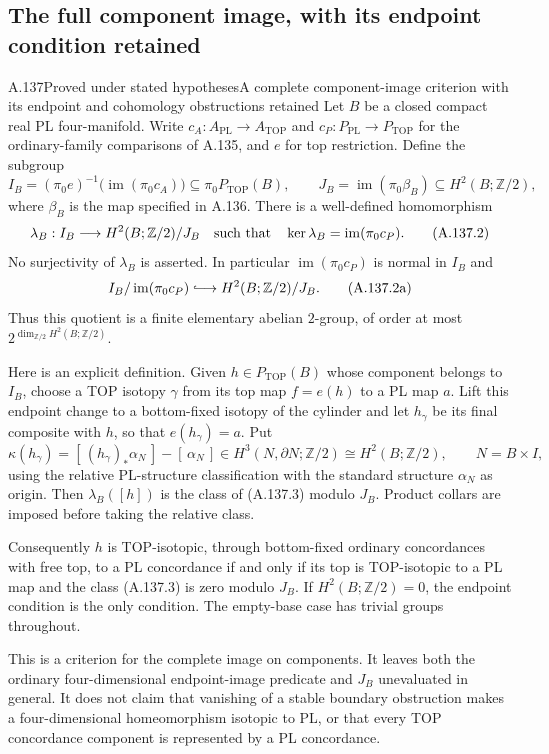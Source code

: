 \subsection{The full component image, with its endpoint condition retained}

\begin{saresult}{A.137}{Proved under stated hypotheses}{A complete component-image criterion with its endpoint and cohomology obstructions retained}
Let $B$ be a closed compact real PL four-manifold. Write
$c_A:A_{\mathrm{PL}}\to A_{\mathrm{TOP}}$ and
$c_P:P_{\mathrm{PL}}\to P_{\mathrm{TOP}}$ for the ordinary-family
comparisons of A.135, and $e$ for top restriction. Define the subgroup
\[
 I_B=(\pi_0e)^{-1}
       \bigl(\operatorname{im}(\pi_0c_A)\bigr)
       \subseteq\pi_0P_{\mathrm{TOP}}(B),
 \qquad
 J_B=\operatorname{im}(\pi_0\beta_B)
       \subseteq H^2(B;\mathbb Z/2),                    \tag{A.137.1}
\]
where $\beta_B$ is the map specified in A.136. There is a
well-defined homomorphism
\[
 \lambda_B:I_B\longrightarrow H^2(B;\mathbb Z/2)/J_B
 \quad\hbox{such that}\quad
 \ker\lambda_B=\operatorname{im}(\pi_0c_P).             \tag{A.137.2}
\]
No surjectivity of $\lambda_B$ is asserted.
In particular $\operatorname{im}(\pi_0c_P)$ is normal in $I_B$ and
\[
 I_B/\operatorname{im}(\pi_0c_P)
     \lhook\joinrel\longrightarrow H^2(B;\mathbb Z/2)/J_B.
                                                               \tag{A.137.2a}
\]
Thus this quotient is a finite elementary abelian $2$-group, of
order at most $2^{\dim_{\mathbb Z/2}H^2(B;\mathbb Z/2)}$.

Here is an explicit definition. Given $h\in P_{\mathrm{TOP}}(B)$
whose component belongs to $I_B$, choose a TOP isotopy $\gamma$
from its top map $f=e(h)$ to a PL map $a$. Lift this endpoint change
to a bottom-fixed isotopy of the cylinder and let $h_\gamma$ be its
final composite with $h$, so that $e(h_\gamma)=a$. Put
\[
 \kappa(h_\gamma)
   =[\,(h_\gamma)_*\alpha_N\,]-[\,\alpha_N\,]
   \in H^3(N,\partial N;\mathbb Z/2)
   \cong H^2(B;\mathbb Z/2),\qquad N=B\times I,         \tag{A.137.3}
\]
using the relative PL-structure classification with the standard
structure $\alpha_N$ as origin. Then
$\lambda_B([h])$ is the class of (A.137.3) modulo $J_B$.
Product collars are imposed before taking the relative class.

Consequently $h$ is TOP-isotopic, through bottom-fixed ordinary
concordances with free top, to a PL concordance if and only if its top
is TOP-isotopic to a PL map and the class (A.137.3) is zero modulo
$J_B$. If $H^2(B;\mathbb Z/2)=0$, the endpoint condition is the only
condition. The empty-base case has trivial groups throughout.

This is a criterion for the complete image on components. It leaves
both the ordinary four-dimensional endpoint-image predicate and
$J_B$ unevaluated in general. It does not claim that vanishing of a
stable boundary obstruction makes a four-dimensional homeomorphism
isotopic to PL, or that every TOP concordance component is represented
by a PL concordance.
\end{saresult}
